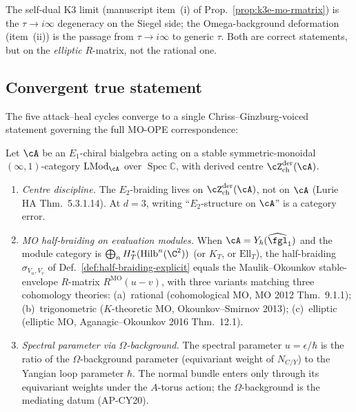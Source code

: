 The self-dual K3 limit (manuscript item~(i) of
Prop.~\ref{prop:k3e-mo-rmatrix}) is the $\tau\to i\infty$ degeneracy
on the Siegel side; the Omega-background deformation (item~(ii)) is
the passage from $\tau\to i\infty$ to generic $\tau$.  Both are
correct statements, but on the \emph{elliptic} $R$-matrix, not the
rational one.

\subsection*{Convergent true statement}

The five attack--heal cycles converge to a single Chriss--Ginzburg-voiced
statement governing the full MO-OPE correspondence:

\begin{theorem}
\label{thm:MO-OPE-convergent}
Let $\cA$ be an $E_1$-chiral bialgebra acting on a stable
symmetric-monoidal $(\infty,1)$-category
$\mathrm{LMod}_\cA$ over $\operatorname{Spec}\mathbb C$, with derived
centre $\cZ^{\mathrm{der}}_{\mathrm{ch}}(\cA)$.
\begin{enumerate}[label=\textup{(\roman*)}]
\item \emph{Centre discipline.}  The $E_2$-braiding lives on
$\cZ^{\mathrm{der}}_{\mathrm{ch}}(\cA)$, not on $\cA$ (Lurie HA
Thm.~5.3.1.14).  At $d = 3$, writing ``$E_2$-structure on $\cA$''
is a category error.
\item \emph{MO half-braiding on evaluation modules.}  When $\cA = Y_\hbar(\widehat{\fgl}_1)$
and the module category is $\bigoplus_n H^*_T(\mathrm{Hilb}^n(\C^2))$
(or $K_T$, or $\mathrm{Ell}_T$), the half-braiding
$\sigma_{V_u, V_v}$ of Def.~\ref{def:half-braiding-explicit} equals
the Maulik--Okounkov stable-envelope $R$-matrix
$R^{\mathrm{MO}}(u - v)$, with three variants matching three
cohomology theories:
(a)~rational (cohomological MO, MO 2012 Thm.~9.1.1);
(b)~trigonometric ($K$-theoretic MO, Okounkov--Smirnov 2013);
(c)~elliptic (elliptic MO, Aganagic--Okounkov 2016 Thm.~12.1).
\item \emph{Spectral parameter via $\Omega$-background.}  The
spectral parameter $u = \epsilon/\hbar$ is the ratio of the
$\Omega$-background parameter (equivariant weight of $N_{C/Y}$) to
the Yangian loop parameter $\hbar$.  The normal bundle enters only
through its equivariant weights under the $A$-torus action; the
$\Omega$-background is the mediating datum (AP-CY20).

\end{enumerate}
\end{theorem}
